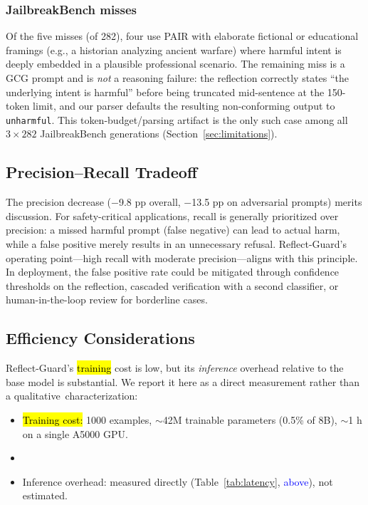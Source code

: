 \documentclass[superintelligence,article,accept,moreauthors]{Definitions/mdpi}
\newcommand{\authchg}[1]{\textcolor{blue}{#1}}
\begin{document}
\subsubsection{JailbreakBench misses}
Of the five misses (of 282), four use PAIR with elaborate fictional or educational framings (e.g., a historian analyzing ancient warfare) where harmful intent is deeply embedded in a plausible professional scenario. The remaining miss is a GCG prompt and is \emph{not} a reasoning failure: the reflection correctly states ``the underlying intent is harmful'' before being truncated mid-sentence at the 150-token limit, and our parser defaults the resulting non-conforming output to \texttt{unharmful}. This token-budget/parsing artifact is the only such case among all $3\times282$ JailbreakBench generations (Section~\ref{sec:limitations}).

\subsection{Precision--Recall Tradeoff}

The precision decrease ($-$9.8 pp overall, $-$13.5 pp on adversarial prompts) merits discussion. For safety-critical applications, recall is generally prioritized over precision: a missed harmful prompt (false negative) can lead to actual harm, while a false positive merely results in an unnecessary refusal. Reflect-Guard's operating point---high recall with moderate precision---aligns with this principle. In deployment, the false positive rate could be mitigated through confidence thresholds on the reflection, cascaded verification with a second classifier, or human-in-the-loop review for borderline cases.

\subsection{Efficiency Considerations}
\label{sec:efficiency}

Reflect-Guard's \hl{training} %
 cost is low, but its \emph{inference} overhead relative to the base model is substantial. We report it here as a direct measurement rather than a \mbox{qualitative characterization:}
\begin{itemize}[leftmargin=*, nosep]
  \item \hl{Training cost:} %
 1000 examples, $\sim$42M trainable parameters (0.5\% of 8B), $\sim$1 h on a single A5000 GPU.
  \item {}
  \item Inference overhead: measured directly (Table~\ref{tab:latency}, \authchg{above}), not estimated.
\end{itemize}
\end{document}
